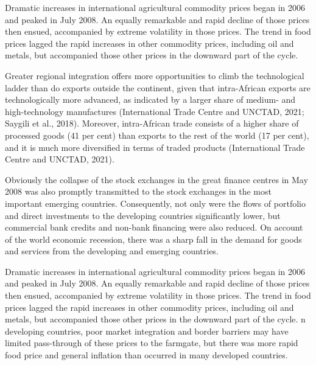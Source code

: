 \documentclass[
]{article}
\begin{document}
Dramatic increases in international agricultural commodity prices began
in 2006 and peaked in July 2008. An equally remarkable and rapid decline
of those prices then ensued, accompanied by extreme volatility in those
prices. The trend in food prices lagged the rapid increases in other
commodity prices, including oil and metals, but accompanied those other
prices in the downward part of the cycle.

Greater regional integration offers more opportunities to climb the
technological ladder than do exports outside the continent, given that
intra-African exports are technologically more advanced, as indicated by
a larger share of medium- and high-technology manufactures
(International Trade Centre and UNCTAD, 2021; Saygili et al., 2018).
Moreover, intra-African trade consists of a higher share of processed
goods (41 per cent) than exports to the rest of the world (17 per cent),
and it is much more diversified in terms of traded products
(International Trade Centre and UNCTAD, 2021).

Obviously the collapse of the stock exchanges in the great finance
centres in May 2008 was also promptly transmitted to the stock exchanges
in the most important emerging countries. Consequently, not only were
the flows of portfolio and direct investments to the developing
countries significantly lower, but commercial bank credits and non-bank
financing were also reduced. On account of the world economic recession,
there was a sharp fall in the demand for goods and services from the
developing and emerging countries.

Dramatic increases in international agricultural commodity prices began
in 2006 and peaked in July 2008. An equally remarkable and rapid decline
of those prices then ensued, accompanied by extreme volatility in those
prices. The trend in food prices lagged the rapid increases in other
commodity prices, including oil and metals, but accompanied those other
prices in the downward part of the cycle. n developing countries, poor
market integration and border barriers may have limited pass-through of
these prices to the farmgate, but there was more rapid food price and
general inflation than occurred in many developed countries.
\end{document}
